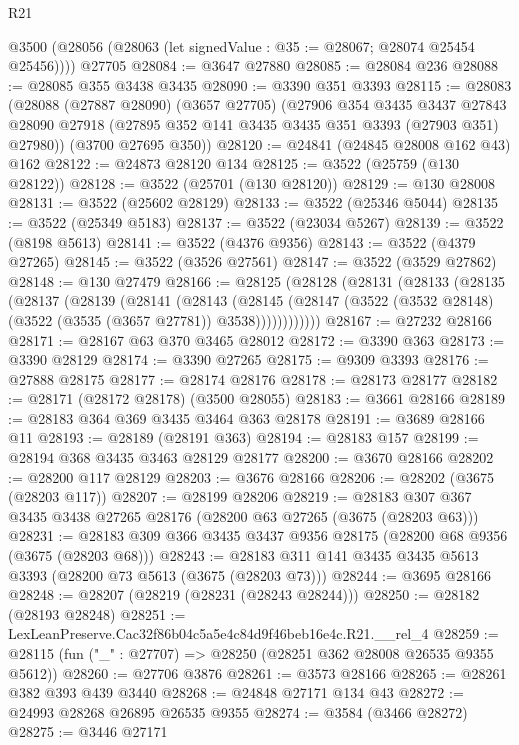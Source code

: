 \begin{lexlean}{R21}
\begin{coremodule}
    @3500 (@28056 (@28063 (let signedValue : @35 := @28067; @28074 @25454 @25456))))
    @27705
@28084 := @3647 @27880
@28085 := @28084 @236
@28088 := @28085 @355 @3438 @3435
@28090 := @3390 @351 @3393
@28115 := @28083
    (@28088
      (@27887 @28090)
      (@3657 @27705)
      (@27906
        @354
        @3435
        @3437
        @27843
        @28090
        @27918
        (@27895 @352 @141 @3435 @3435 @351 @3393 (@27903 @351) @27980))
      (@3700 @27695 @350))
@28120 := @24841 (@24845 @28008 @162 @43) @162
@28122 := @24873 @28120 @134
@28125 := @3522 (@25759 (@130 @28122))
@28128 := @3522 (@25701 (@130 @28120))
@28129 := @130 @28008
@28131 := @3522 (@25602 @28129)
@28133 := @3522 (@25346 @5044)
@28135 := @3522 (@25349 @5183)
@28137 := @3522 (@23034 @5267)
@28139 := @3522 (@8198 @5613)
@28141 := @3522 (@4376 @9356)
@28143 := @3522 (@4379 @27265)
@28145 := @3522 (@3526 @27561)
@28147 := @3522 (@3529 @27862)
@28148 := @130 @27479
@28166 := @28125
    (@28128
      (@28131
        (@28133
          (@28135
            (@28137
              (@28139
                (@28141
                  (@28143
                    (@28145
                      (@28147 (@3522 (@3532 @28148) (@3522 (@3535 (@3657 @27781)) @3538))))))))))))
@28167 := @27232 @28166
@28171 := @28167 @63 @370 @3465 @28012
@28172 := @3390 @363
@28173 := @3390 @28129
@28174 := @3390 @27265
@28175 := @9309 @3393
@28176 := @27888 @28175
@28177 := @28174 @28176
@28178 := @28173 @28177
@28182 := @28171 (@28172 @28178) (@3500 @28055)
@28183 := @3661 @28166
@28189 := @28183 @364 @369 @3435 @3464 @363 @28178
@28191 := @3689 @28166 @11
@28193 := @28189 (@28191 @363)
@28194 := @28183 @157
@28199 := @28194 @368 @3435 @3463 @28129 @28177
@28200 := @3670 @28166
@28202 := @28200 @117 @28129
@28203 := @3676 @28166
@28206 := @28202 (@3675 (@28203 @117))
@28207 := @28199 @28206
@28219 := @28183 @307 @367 @3435 @3438 @27265 @28176 (@28200 @63 @27265 (@3675 (@28203 @63)))
@28231 := @28183 @309 @366 @3435 @3437 @9356 @28175 (@28200 @68 @9356 (@3675 (@28203 @68)))
@28243 := @28183 @311 @141 @3435 @3435 @5613 @3393 (@28200 @73 @5613 (@3675 (@28203 @73)))
@28244 := @3695 @28166
@28248 := @28207 (@28219 (@28231 (@28243 @28244)))
@28250 := @28182 (@28193 @28248)
@28251 := LexLeanPreserve.Cac32f86b04c5a5e4c84d9f46beb16e4c.R21.__rel_4
@28259 := @28115 (fun ("_" : @27707) => @28250 (@28251 @362 @28008 @26535 @9355 @5612))
@28260 := @27706 @3876
@28261 := @3573 @28166
@28265 := @28261 @382 @393 @439 @3440
@28268 := @24848 @27171 @134 @43
@28272 := @24993 @28268 @26895 @26535 @9355
@28274 := @3584 (@3466 @28272)
@28275 := @3446 @27171

\end{coremodule}
\end{lexlean}
